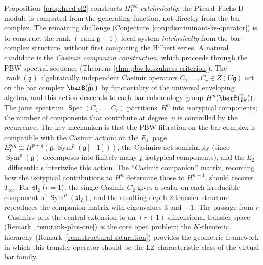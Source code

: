 \begin{remark}\label{rem:hred-intrinsic}
Proposition~\ref{prop:hred-sl2} constructs $H^{\mathrm{red}}_1$
\emph{extrinsically}: the Picard--Fuchs D-module is computed from
the generating function, not directly from the bar complex.
The remaining challenge
(Conjecture~\ref{conj:discriminant-ks-operator}) is to
construct the rank-$(\operatorname{rank}\mathfrak{g}{+}1)$
local system \emph{intrinsically} from the bar-complex structure,
without first computing the Hilbert series.
A natural candidate is the \emph{Casimir companion construction},
which proceeds through the PBW spectral sequence
(Theorem~\ref{thm:pbw-koszulness-criterion}).
The $\operatorname{rank}(\mathfrak{g})$ algebraically independent
Casimir operators $C_1, \ldots, C_r \in Z(U\mathfrak{g})$ act on
the bar complex $\barB(\widehat{\mathfrak{g}}_k)$ by functoriality
of the universal enveloping algebra, and this action descends to
each bar cohomology group
$H^n(\barB(\widehat{\mathfrak{g}}_k))$.  The joint spectrum
$\operatorname{Spec}(C_1, \ldots, C_r)$ partitions~$H^n$ into
isotypical components; the number of components that contribute
at degree~$n$ is controlled by the recurrence.
The key mechanism is that the PBW filtration on the bar complex is
compatible with the Casimir action: on the $E_1$~page
$E_1^{p,q} \cong H^{p+q}(\mathfrak{g}, \operatorname{Sym}^p
(\mathfrak{g}[-1]))$, the Casimirs act semisimply (since
$\operatorname{Sym}^p(\mathfrak{g})$ decomposes into finitely many
$\mathfrak{g}$-isotypical components), and the $E_2$~differentials
intertwine this action.  The ``Casimir companion'' matrix, recording
how the isotypical contributions to $H^n$ determine those
to $H^{n+1}$, should recover~$T_{\mathrm{rec}}$.
For $\mathfrak{sl}_2$ ($r = 1$), the single Casimir $C_2$ gives a
scalar on each irreducible component of $\operatorname{Sym}^p
(\mathfrak{sl}_2)$, and the resulting depth-$2$ transfer structure
reproduces the companion matrix with eigenvalues $3$ and~$-1$.
The passage from $r$~Casimirs plus the central extension to an
$(r{+}1)$-dimensional transfer space
(Remark~\ref{rem:rank-plus-one}) is the core open problem; the
$K$-theoretic hierarchy
(Remark~\ref{rem:structural-saturation}) provides the
geometric framework in which this transfer operator
should be the L2~characteristic class of the virtual bar family.
\end{remark}

